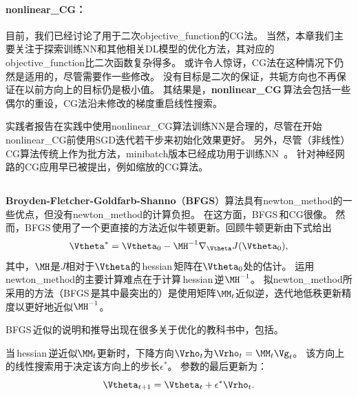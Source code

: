 \paragraph{\gls{nonlinear_CG}：}
目前，我们已经讨论了用于二次\gls{objective_function}的\gls{CG}法。
当然，本章我们主要关注于探索训练\gls{NN}和其他相关\gls{DL}模型的优化方法，其对应的\gls{objective_function}比二次函数复杂得多。
或许令人惊讶，\gls{CG}法在这种情况下仍然是适用的，尽管需要作一些修改。
没有目标是二次的保证，共轭方向也不再保证在以前方向上的目标仍是极小值。
其结果是，\textbf{\gls{nonlinear_CG}}\,算法会包括一些偶尔的重设，\gls{CG}法沿未修改的梯度重启线性搜索。


实践者报告在实践中使用\gls{nonlinear_CG}算法训练\gls{NN}是合理的，尽管在开始\gls{nonlinear_CG}前使用\gls{SGD}迭代若干步来初始化效果更好。
另外，尽管（非线性）\gls{CG}算法传统上作为批方法，\gls{minibatch}版本已经成功用于训练\gls{NN}~\citep{Le-et-al-2011}。
针对神经网路的\gls{CG}应用早已被提出，例如缩放的\gls{CG}算法\citep{Moller-1993}。

\subsection{}
\label{sec:bfgs}
\textbf{Broyden-Fletcher-Goldfarb-Shanno}（\textbf{\gls{BFGS}}）算法具有\gls{newton_method}的一些优点，但没有\gls{newton_method}的计算负担。
在这方面，\gls{BFGS}\,和CG很像。
然而，\gls{BFGS}\,使用了一个更直接的方法近似牛顿更新。回顾牛顿更新由下式给出
\begin{equation}
    \Vtheta^* = \Vtheta_0 - \MH^{-1} \nabla_{\Vtheta} J(\Vtheta_0),
\end{equation}
其中，$\MH$是$J$相对于$\Vtheta$的\,\gls{hessian}\,矩阵在$\Vtheta_0$处的估计。
运用\gls{newton_method}的主要计算难点在于计算\,\gls{hessian}\,逆$\MH^{-1}$。
拟\gls{newton_method}所采用的方法（\gls{BFGS}\,是其中最突出的）是使用矩阵$\MM_t$近似逆，迭代地低秩更新精度以更好地近似$\MH^{-1}$。


\gls{BFGS}\,近似的说明和推导出现在很多关于优化的教科书中，包括\cite{Luenberger-1984}。

当\,\gls{hessian}\,逆近似$\MM_t$更新时，下降方向$\Vrho_t$为$\Vrho_t = \MM_t \Vg_t$。
该方向上的线性搜索用于决定该方向上的步长$\epsilon^*$。
参数的最后更新为：
\begin{equation}
    \Vtheta_{t+1} = \Vtheta_t + \epsilon^* \Vrho_t.
\end{equation}

